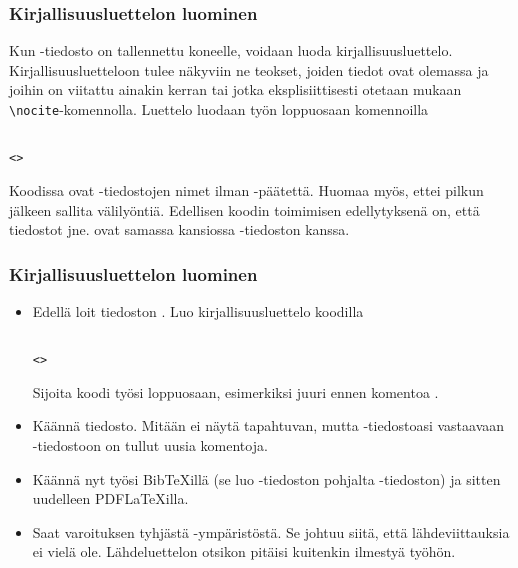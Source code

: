 \begin{fframe}
    \frametitle{Kirjallisuusluettelon luominen}
    Kun -tiedosto on tallennettu koneelle, voidaan luoda kirjallisuusluettelo. Kirjallisuusluetteloon tulee näkyviin ne teokset, joiden tiedot ovat olemassa ja joihin on viitattu ainakin kerran tai jotka eksplisiittisesti otetaan mukaan \lstinline-\nocite--komennolla.
    \pause
    \vaihto
    Luettelo luodaan työn loppuosaan komennoilla
    \begin{lstlisting}

<>
    \end{lstlisting}
    Koodissa  ovat -tiedostojen nimet ilman -päätettä. Huomaa myös, ettei pilkun jälkeen sallita välilyöntiä.
    \vaihto
    Edellisen koodin toimimisen edellytyksenä on, että tiedostot  jne. ovat samassa kansiossa -tiedoston kanssa. 
\end{fframe}

\begin{fframe}
    \frametitle{Kirjallisuusluettelon luominen}
    \begin{harj}
        \begin{itemize}
            \item Edellä loit tiedoston . Luo kirjallisuusluettelo koodilla 
                \begin{lstlisting}

<>
                \end{lstlisting}
                Sijoita koodi työsi loppuosaan, esimerkiksi juuri ennen komentoa \lstinline--.
            \item Käännä tiedosto. Mitään ei näytä tapahtuvan, mutta -tiedostoasi vastaavaan -tiedostoon on tullut uusia komentoja.
            \item Käännä nyt työsi BibTeXillä (se luo -tiedoston pohjalta -tiedoston) ja sitten uudelleen PDFLaTeXilla.
            \item Saat varoituksen tyhjästä -ympäristöstä. Se johtuu siitä, että lähdeviittauksia ei vielä ole. Lähdeluettelon otsikon pitäisi kuitenkin ilmestyä työhön.
        \end{itemize}
    \end{harj}
\end{fframe}

